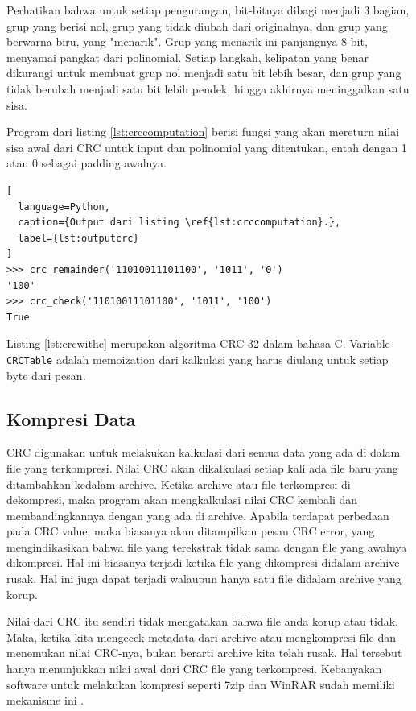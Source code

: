 Perhatikan bahwa untuk setiap pengurangan, bit-bitnya dibagi menjadi 3 bagian, grup yang berisi nol, grup yang tidak diubah dari originalnya, dan grup yang berwarna biru, yang "menarik". Grup yang menarik ini panjangnya 8-bit, menyamai pangkat dari polinomial. Setiap langkah, kelipatan yang benar dikurangi untuk membuat grup nol menjadi satu bit lebih besar, dan grup yang tidak berubah menjadi satu bit lebih pendek, hingga akhirnya meninggalkan satu sisa.



Program dari listing \ref{lst:crccomputation} berisi fungsi yang akan mereturn nilai sisa awal dari CRC untuk input dan polinomial yang ditentukan, entah dengan 1 atau 0 sebagai padding awalnya.

\begin{lstlisting}[
  language=Python,
  caption={Output dari listing \ref{lst:crccomputation}.},
  label={lst:outputcrc}
]
>>> crc_remainder('11010011101100', '1011', '0')
'100'
>>> crc_check('11010011101100', '1011', '100')
True
\end{lstlisting}



Listing \ref{lst:crcwithc} merupakan algoritma CRC-32 \citep{microsoft2019} dalam bahasa C. Variable \lstinline{CRCTable} adalah memoization dari kalkulasi yang harus diulang untuk setiap byte dari pesan.

\subsection{Kompresi Data}
\label{subsec:kompresidata}

CRC digunakan untuk melakukan kalkulasi dari semua data yang ada di dalam file yang terkompresi. Nilai CRC akan dikalkulasi setiap kali ada file baru yang ditambahkan kedalam archive. Ketika archive atau file terkompresi di dekompresi, maka program akan mengkalkulasi nilai CRC kembali dan membandingkannya dengan yang ada di archive. Apabila terdapat perbedaan pada CRC value, maka biasanya akan ditampilkan pesan CRC error, yang mengindikasikan bahwa file yang terekstrak tidak sama dengan file yang awalnya dikompresi. Hal ini biasanya terjadi ketika file yang dikompresi didalam archive rusak. Hal ini juga dapat terjadi walaupun hanya satu file didalam archive yang korup.

Nilai dari CRC itu sendiri tidak mengatakan bahwa file anda korup atau tidak. Maka, ketika kita mengecek metadata dari archive atau mengkompresi file dan menemukan nilai CRC-nya, bukan berarti archive kita telah rusak. Hal tersebut hanya menunjukkan nilai awal dari CRC file yang terkompresi. Kebanyakan software untuk melakukan kompresi seperti 7zip dan WinRAR sudah memiliki mekanisme ini \citep{7zip}.

